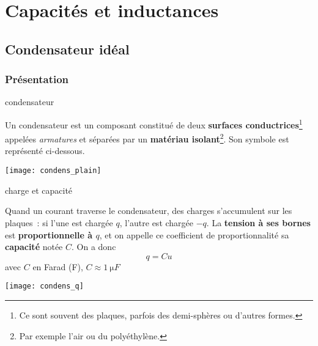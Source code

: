 \documentclass[../main/main.tex]{subfiles}
\begin{document}
\setcounter{chapter}{2}

\chapter{Capacit\'es et inductances}

\section{Condensateur idéal}
\subsection{Présentation}

\begin{tcbraster}[raster columns=2, raster equal height=rows]
    \begin{defi}[label=def:condens]{condensateur}

        Un condensateur est un composant constitué de deux \textbf{surfaces
        conductrices}\footnote{Ce sont souvent des plaques, parfois des
        demi-sphères ou d'autres formes.} appelées \textit{armatures} et
        séparées par un \textbf{matériau isolant}\footnote{Par exemple l'air ou
        du polyéthylène.}. Son symbole est représenté ci-dessous.

        \tcblower
        \begin{center}
            \texttt{[image: condens\_plain]}
        \end{center}
    \end{defi}
    \begin{prop}[label=prop:Ccondens]{charge et capacité}

        Quand un courant traverse le condensateur, des charges s'accumulent sur
        les plaques~: si l'une est chargée $q$, l'autre est chargée $-q$. La
        \textbf{tension à ses bornes} est \textbf{proportionnelle à $q$}, et on
        appelle ce coefficient de proportionnalité sa \textbf{capacité} notée
        $C$. On a donc
        \[\boxed{q = Cu}\]
        avec $C$ en Farad (F), $C \approx \SI{1}{\micro F}$
        \tcblower
        \begin{center}
            \texttt{[image: condens\_q]}
        \end{center}
    \end{prop}
\end{tcbraster}
\end{document}
